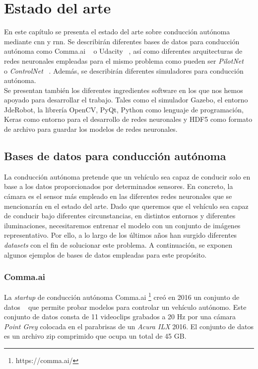 \chapter{Estado del arte}\label{cap.estado}

En este capítulo se presenta el estado del arte sobre conducción autónoma mediante \acrfull{cnn} y \acrfull{rnn}. Se describirán diferentes bases de datos para conducción autónoma como Comma.ai ~\cite{comma} o Udacity ~\cite{udacity-data}, así como diferentes arquitecturas de redes neuronales empleadas para el mismo problema como pueden ser \textit{PilotNet} ~\cite{explaining-end2end} o \textit{ControlNet} ~\cite{reactive-ground}. Además, se describirán diferentes simuladores para conducción autónoma.\\

Se presentan también los diferentes ingredientes software en los que nos hemos apoyado para desarrollar el trabajo. Tales como el simulador Gazebo, el entorno JdeRobot, la librería OpenCV, PyQt, Python como lenguaje de programación, Keras como entorno para el desarrollo de redes neuronales y HDF5 como formato de archivo para guardar los modelos de redes neuronales.\\


\section{Bases de datos para conducción autónoma}

La conducción autónoma pretende que un vehículo sea capaz de conducir solo en base a los datos proporcionados por determinados sensores. En concreto, la cámara es el sensor más empleado en las diferentes redes neuronales que se mencionarán en el estado del arte. Dado que queremos que el vehículo sea capaz de conducir bajo diferentes circunstancias, en distintos entornos y diferentes iluminaciones, necesitaremos entrenar el modelo con un conjunto de imágenes representativo. Por ello, a lo largo de los últimos años han surgido diferentes \textit{datasets} con el fin de solucionar este problema. A continuación, se exponen algunos ejemplos de bases de datos empleadas para este propósito.

\subsection{Comma.ai}

La \textit{startup} de conducción autónoma Comma.ai \footnote{https://comma.ai/} creó en 2016 un conjunto de datos ~\cite{comma} que permite probar modelos para controlar un vehículo autónomo. Este conjunto de datos consta de 11 videoclips grabados a 20 Hz por una cámara \textit{Point Grey} colocada en el parabrisas de un \textit{Acura ILX} 2016. El conjunto de datos es un archivo zip comprimido que ocupa un total de 45 GB.\\

